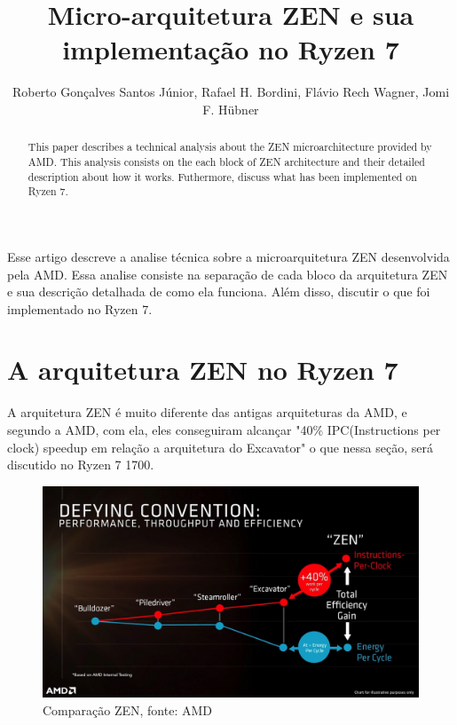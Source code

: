 \documentclass[12pt]{article}
\title{Micro-arquitetura ZEN e sua implementação no Ryzen 7}
\author{Roberto Gonçalves Santos Júnior\inst{1}, Rafael H. Bordini\inst{2}, Flávio Rech
  Wagner\inst{1}, Jomi F. Hübner\inst{3} }
\begin{document}
 

\maketitle

\begin{abstract}
  This paper describes a technical analysis about the ZEN microarchitecture provided by AMD. This analysis consists on the each block of ZEN architecture and their detailed description about how it works. Futhermore, discuss what has been implemented on Ryzen 7.
\end{abstract}
     
\begin{resumo} 
  Esse artigo descreve a analise técnica sobre a microarquitetura ZEN desenvolvida pela AMD. Essa analise consiste na separação de cada bloco da arquitetura ZEN e sua descrição detalhada de como ela funciona. Além disso, discutir o que foi implementado no Ryzen 7. 
\end{resumo}



\section{A arquitetura ZEN no Ryzen 7}

A arquitetura ZEN é muito diferente das antigas arquiteturas da AMD, e segundo a AMD, com ela, eles conseguiram alcançar "40\% IPC(Instructions per clock) speedup em relação a arquitetura do  Excavator" o que nessa seção, será discutido no Ryzen 7 1700.\\

\begin{figure}[ht]
\centering
\includegraphics[width=120mm,scale=0.8]{AMD-energy-per-cycle.jpg}
\caption{Comparação ZEN, fonte: AMD}
\label{fig:AMD CORE}
\end{figure}
\end{document}
